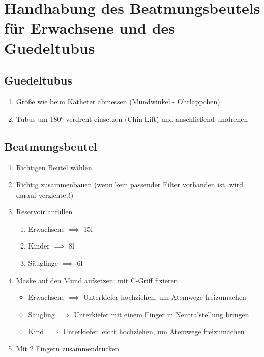 \chapter{Handhabung des Beatmungsbeutels für Erwachsene und des Guedeltubus}
\section{Guedeltubus}
\begin{enumerate}
    \item Größe wie beim Katheter abmessen (Mundwinkel - Ohrläppchen)
    \item Tubus um 180° verdreht einsetzen (Chin-Lift) und anschließend umdrehen
\end{enumerate}
\section{Beatmungsbeutel}
\begin{enumerate}
    \item Richtigen Beutel wählen
    \item Richtig zusammenbauen (wenn kein passender Filter vorhanden ist, wird darauf verzichtet!)
    \item Reservoir anfüllen
          \begin{enumerate}
              \item Erwachsene $\implies$ 15l
              \item Kinder $\implies$ 8l
              \item Säuglinge $\implies$ 6l
          \end{enumerate}
    \item Maske auf den Mund aufsetzen; mit C-Griff fixieren
          \begin{itemize}
              \item Erwachsene $\implies$ Unterkiefer hochziehen, um Atemwege freizumachen
              \item Säugling $\implies$ Unterkiefer mit einem Finger in Neutralstellung bringen
              \item Kind $\implies$ Unterkiefer leicht hochziehen, um Atemwege freizumachen
          \end{itemize}
    \item Mit 2 Fingern zusammendrücken
\end{enumerate}
